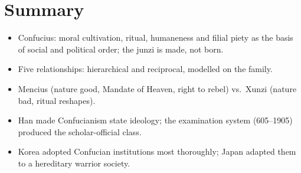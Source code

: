 \section*{Summary}
\begin{itemize}
  \item Confucius: moral cultivation, ritual, humaneness and filial piety as the basis of
        social and political order; the junzi is made, not born.
  \item Five relationships: hierarchical and reciprocal, modelled on the family.
  \item Mencius (nature good, Mandate of Heaven, right to rebel) vs.\ Xunzi (nature bad,
        ritual reshapes).
  \item Han made Confucianism state ideology; the examination system (605--1905) produced
        the scholar-official class.
  \item Korea adopted Confucian institutions most thoroughly; Japan adapted them to a
        hereditary warrior society.
\end{itemize}
